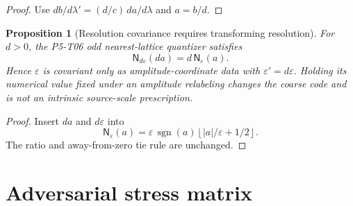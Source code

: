 \documentclass[11pt]{article}
\newtheorem{proposition}{Proposition}
\begin{document}
\begin{proof}
Use \(db/d\lambda'=(d/c)\,da/d\lambda\) and \(a=b/d\).
\end{proof}

\begin{proposition}[Resolution covariance requires transforming resolution]
\label{prop:resolution}
For \(d>0\), the P5-T06 odd nearest-lattice quantizer satisfies
\[
   \mathsf N_{d\varepsilon}(d a)=d\,\mathsf N_\varepsilon(a).
   \tag{3}
\]
Hence \(\varepsilon\) is covariant only as amplitude-coordinate data with
\(\varepsilon'=d\varepsilon\).  Holding its numerical value fixed under an
amplitude relabeling changes the coarse code and is not an intrinsic
source-scale prescription.
\end{proposition}

\begin{proof}
Insert \(da\) and \(d\varepsilon\) into
\[
 \mathsf N_\varepsilon(a)
 =\varepsilon\,\operatorname{sgn}(a)
 \left\lfloor |a|/\varepsilon+1/2\right\rfloor .
\]
The ratio and away-from-zero tie rule are unchanged.
\end{proof}

\section{Adversarial stress matrix}
\end{document}
